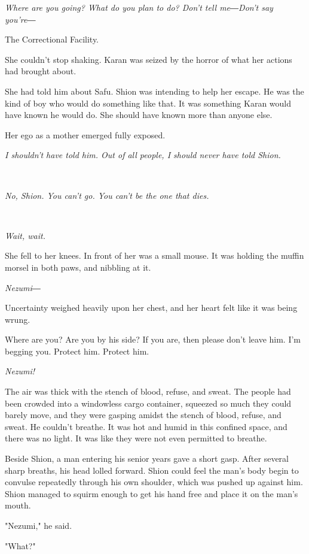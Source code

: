 \emph{Where are you going? What do you plan to do? Don't tell me―Don't
say you're―}

The Correctional Facility.

She couldn't stop shaking. Karan was seized by the horror of what her
actions had brought about.

She had told him about Safu. Shion was intending to help her escape. He
was the kind of boy who would do something like that. It was something
Karan would have known he would do. She should have known more than
anyone else.

Her ego as a mother emerged fully exposed.

\emph{I shouldn't have told him. Out of all people, I should never have
told Shion.}

\emph{\\
}

\emph{No, Shion. You can't go. You can't be the one that dies.}

\emph{\\
}

\emph{Wait, wait.}

She fell to her knees. In front of her was a small mouse. It was holding
the muffin morsel in both paws, and nibbling at it.

\emph{Nezumi―}

Uncertainty weighed heavily upon her chest, and her heart felt like it
was being wrung.

Where are you? Are you by his side? If you are, then please don't leave
him. I'm begging you. Protect him. Protect him.

\emph{Nezumi!}

The air was thick with the stench of blood, refuse, and sweat. The
people had been crowded into a windowless cargo container, squeezed so
much they could barely move, and they were gasping amidst the stench of
blood, refuse, and sweat. He couldn't breathe. It was hot and humid in
this confined space, and there was no light. It was like they were not
even permitted to breathe.

Beside Shion, a man entering his senior years gave a short gasp. After
several sharp breaths, his head lolled forward. Shion could feel the
man's body begin to convulse repeatedly through his own shoulder, which
was pushed up against him. Shion managed to squirm enough to get his
hand free and place it on the man's mouth.

"Nezumi," he said.

"What?"

